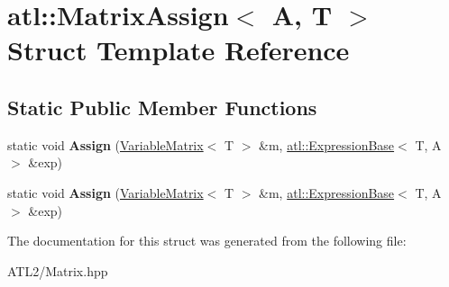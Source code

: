 \hypertarget{structatl_1_1_matrix_assign}{\section{atl\+:\+:Matrix\+Assign$<$ A, T $>$ Struct Template Reference}
\label{structatl_1_1_matrix_assign}
}
\subsection*{Static Public Member Functions}
\begin{DoxyCompactItemize}
\item 
\hypertarget{structatl_1_1_matrix_assign_a020fea7298cdb873eb1f499900e9092f}{static void {\bfseries Assign} (\hyperlink{structatl_1_1_variable_matrix}{Variable\+Matrix}$<$ T $>$ \&m, \hyperlink{structatl_1_1_expression_base}{atl\+::\+Expression\+Base}$<$ T, A $>$ \&exp)}\label{structatl_1_1_matrix_assign_a020fea7298cdb873eb1f499900e9092f}

\item 
\hypertarget{structatl_1_1_matrix_assign_a020fea7298cdb873eb1f499900e9092f}{static void {\bfseries Assign} (\hyperlink{structatl_1_1_variable_matrix}{Variable\+Matrix}$<$ T $>$ \&m, \hyperlink{structatl_1_1_expression_base}{atl\+::\+Expression\+Base}$<$ T, A $>$ \&exp)}\label{structatl_1_1_matrix_assign_a020fea7298cdb873eb1f499900e9092f}

\end{DoxyCompactItemize}


The documentation for this struct was generated from the following file\+:\begin{DoxyCompactItemize}
\item 
A\+T\+L2/Matrix.\+hpp\end{DoxyCompactItemize}
